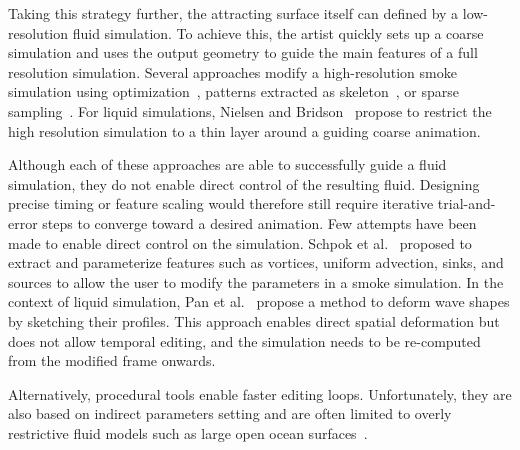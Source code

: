 Taking this strategy further, the attracting surface itself can defined by a low-resolution fluid simulation. To achieve this, the artist quickly sets up a coarse simulation and uses the output geometry to guide the main features of a full resolution simulation.
Several approaches modify a high-resolution smoke simulation using optimization~\cite{Nielsen2009,Nielsen2010}, patterns extracted as skeleton~\cite{Yuan2011}, or sparse sampling~\cite{Huang2013}.
For liquid simulations, Nielsen and Bridson~\cite{Nielsen2011} propose to restrict the high resolution simulation to a thin layer around a guiding coarse animation.

Although each of these approaches are able to successfully guide a fluid simulation, they do not enable direct control of the resulting fluid. 
Designing precise timing or feature scaling would therefore still require iterative trial-and-error steps to converge toward a desired animation.
Few attempts have been made to enable direct control on the simulation. 
Schpok et al.~\cite{Schpok2005} proposed to extract and parameterize features such as vortices, uniform advection, sinks, and sources to allow the user to modify the parameters in a smoke simulation. 
In the context of liquid simulation, Pan et al.~\cite{Pan2013} propose a method to deform wave shapes by sketching their profiles. 
This approach enables direct spatial deformation but does not allow temporal editing, and the simulation needs to be re-computed from the modified frame onwards.

Alternatively, procedural tools enable faster editing loops.
Unfortunately, they are also based on indirect parameters setting and are often limited to overly restrictive fluid models such as large open ocean surfaces~\cite{hinsinger2002,Tessendorf2004,jeschke2015water,horvath2015empirical}.


